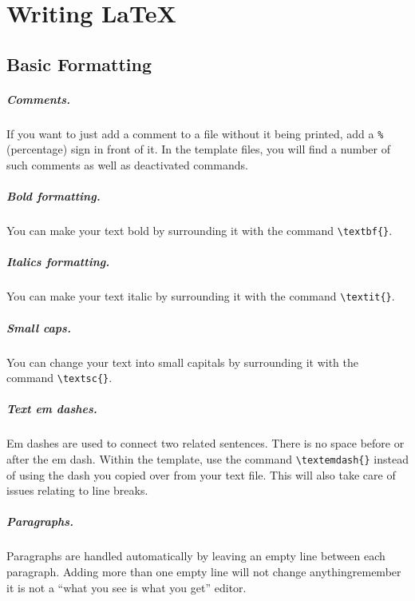 \chapter{Writing \LaTeX{}}\label{cha:c1_firstchapter}

\section{Basic Formatting}\label{sec:c1_basicformatting}

\paragraph{Comments.} If you want to just add a comment to a file without it
being printed, add a \lstinline[language=Tex]!%! (percentage) sign in front of
it. In the template files, you will find a number of such
comments as well as deactivated commands.

\paragraph{Bold formatting.} You can make your text bold by surrounding it
with the command \lstinline[language=Tex]!\textbf{}!.

\paragraph{Italics formatting.} You can make your text italic by surrounding
it with the command \lstinline[language=Tex]!\textit{}!.

\paragraph{Small caps.} You can change your text into small capitals by
surrounding it with the command \lstinline[language=Tex]!\textsc{}!.
    
\paragraph{Text em dashes.} Em dashes are used to connect two related sentences.
There is no space before or after the em dash. Within the template, use the
command \lstinline[language=Tex]!\textemdash{}! instead of using the dash you
copied over from your text file. This will also take care of issues relating to
line breaks.

\paragraph{Paragraphs.} Paragraphs are handled automatically by leaving an empty
line between each paragraph. Adding more than one empty line will not change
anything\textemdash{}remember it is not a ``what you see is what you get''
editor.

